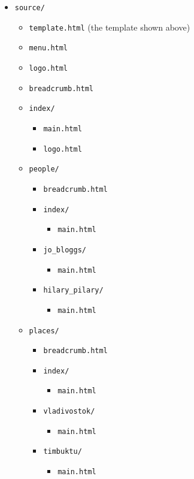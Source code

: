 \documentclass[english]{scrartcl}
\begin{document}
\begin{itemize}
\item \verb|source/|
  \begin{itemize}
  \item \verb|template.html| (the template shown above)
  \item \verb|menu.html|
  \item \verb|logo.html|
  \item \verb|breadcrumb.html|
  \item \verb|index/|
    \begin{itemize}
    \item \verb|main.html|
    \item \verb|logo.html|
    \end{itemize}
  \item \verb|people/|
    \begin{itemize}
    \item \verb|breadcrumb.html|
    \item \verb|index/|
      \begin{itemize}
      \item \verb|main.html|
      \end{itemize}
    \item \verb|jo_bloggs/|
      \begin{itemize}
      \item \verb|main.html|
      \end{itemize}
    \item \verb|hilary_pilary/|
      \begin{itemize}
      \item \verb|main.html|
      \end{itemize}
    \end{itemize}
  \item \verb|places/|
    \begin{itemize}
    \item \verb|breadcrumb.html|
    \item \verb|index/|
      \begin{itemize}
      \item \verb|main.html|
      \end{itemize}
    \item \verb|vladivostok/|
      \begin{itemize}
      \item \verb|main.html|
      \end{itemize}
    \item \verb|timbuktu/|
      \begin{itemize}
      \item \verb|main.html|
      \end{itemize}
    \end{itemize}
  \end{itemize}
\end{itemize}
\end{document}

